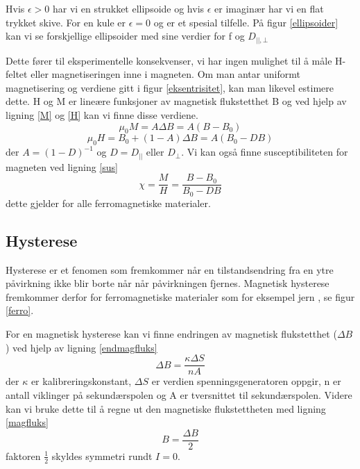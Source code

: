 \documentclass[norsk,a4paper,12pt]{article}
\begin{document}
Hvis $\epsilon >0$ har vi en strukket ellipsoide og hvis $\epsilon$ er imaginær har vi en flat trykket skive. For en kule er $\epsilon = 0$ og er et spesial tilfelle. 
På figur \vref{ellipsoider} kan vi se forskjellige ellipsoider med sine verdier for f og $D_{||,\bot}$ 

Dette fører til eksperimentelle konsekvenser, vi har ingen mulighet til å måle H-feltet eller magnetiseringen inne i magneten. Om man antar uniformt magnetisering og verdiene gitt i figur \vref{eksentrisitet}, kan man likevel estimere dette. H og M er lineære funksjoner av magnetisk flukstetthet B og ved hjelp av ligning \ref{M} og \vref{H} kan vi finne disse verdiene.
\begin{equation}
\mu_0M=A\Delta B = A(B-B_0)
\label{M}
\end{equation}
\begin{equation}
\mu_0H=B_0 + (1-A)\Delta B = A(B_0-DB)
\label{H}
\end{equation}
der $A = (1-D)^{-1}$ og $D = D_{||}$ eller $D_\bot$. Vi kan også finne susceptibiliteten for magneten ved ligning \vref{sus}
\begin{equation}
\chi = \frac{M}{H} = \frac{B-B_0}{B_0-DB}
\label{sus}
\end{equation}
dette gjelder for alle ferromagnetiske materialer.

\subsection{Hysterese}
Hysterese er et fenomen som fremkommer når en tilstandsendring fra en ytre påvirkning ikke blir borte når når påvirkningen fjernes. Magnetisk hysterese fremkommer derfor for ferromagnetiske materialer som for eksempel jern \cite{snlh}, se figur \vref{ferro}. 

For en magnetisk hysterese kan vi finne endringen av magnetisk flukstetthet ($\Delta B$) ved hjelp av ligning \vref{endmagfluks}
\begin{equation}
\Delta B = \frac{\kappa \Delta S}{nA}
\label{endmagfluks}
\end{equation}
der $\kappa$ er kalibreringskonstant, $\Delta S$ er verdien spenningsgeneratoren oppgir, n er antall viklinger på sekundærspolen og A er tversnittet til sekundærspolen. Videre kan vi bruke dette til å regne ut den magnetiske flukstettheten med ligning \vref{magfluks}
\begin{equation}
B = \frac{\Delta B}{2}
\label{magfluks}
\end{equation}
faktoren $\frac{1}{2}$ skyldes symmetri rundt $I = 0$.
\end{document}
